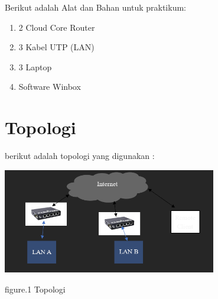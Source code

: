 Berikut adalah Alat dan Bahan untuk praktikum:

\begin{enumerate}
    \item 2 Cloud Core Router
    \item 3 Kabel UTP (LAN)
    \item 3 Laptop
    \item Software Winbox
\end{enumerate}

\section{Topologi}

berikut adalah topologi yang digunakan :

\begin{center}
    \includegraphics[width=0.7\textwidth]{image/P4/Topologi.png}    
    
    figure.1 Topologi
\end{center}

